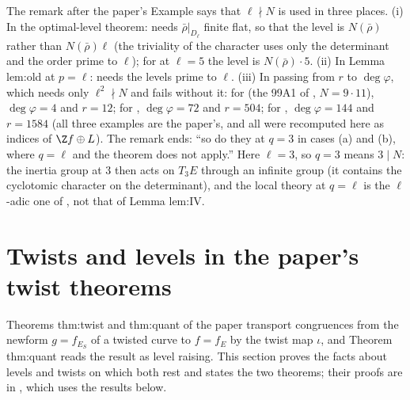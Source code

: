 \begin{remark}\label{rem:modgalrep:l-divides-N}
The remark after the paper's Example says that $\ell\nmid N$ is used in three places. (i) In the optimal-level theorem:  needs $\bar\rho|_{D_\ell}$
finite flat, so that the level is $N(\bar\rho)$ rather than $N(\bar\rho)\ell$ (the triviality of the character uses only the determinant and the order prime to $\ell$); for  at $\ell=5$ the level is $N(\bar\rho)\cdot5$. (ii) In Lemma lem:old at $p=\ell$:
 needs the levels prime to $\ell$. (iii) In passing from $r$ to $\deg\varphi$, which needs only $\ell^2\nmid N$ and fails without it: for
 (the 99A1 of \cite[Table 1]{ARS12}, $N=9\cdot11$), $\deg\varphi=4$ and $r=12$; for , $\deg\varphi=72$ and $r=504$; for , $\deg\varphi=144$ and $r=1584$ (all three examples are the paper's, and all were
recomputed here as indices of $\Z f\oplus L$). The
remark ends: ``so do they at $q=3$ in cases (a) and (b), where $q=\ell$ and the theorem does not apply.'' Here $\ell=3$, so $q=3$ means $3\mid N$: the inertia group at $3$ then
acts on $T_3E$ through an infinite group (it contains the cyclotomic character on the determinant), and the local theory at $q=\ell$ is the $\ell$-adic one of
, not that of Lemma lem:IV.
\end{remark}

\section[Twists and levels]{Twists and levels in the paper's twist theorems}\label{sec:modgalrep:twisting}

Theorems thm:twist and thm:quant of the paper transport congruences from the newform $g=f_{E_S}$ of a twisted curve to $f=f_E$ by the twist map
$\iota$, and Theorem thm:quant reads the result as level raising. This section proves the facts about levels and twists on which both rest
and states the two theorems; their proofs are in , which uses the results below.

